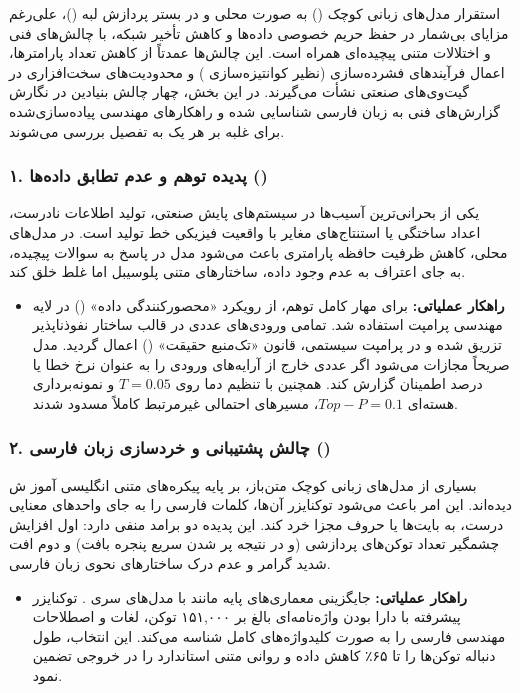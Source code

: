 \documentclass[a4paper, 10pt, twocolumn]{article}
\begin{document}
	استقرار مدل‌های زبانی کوچک () به صورت محلی و در بستر پردازش لبه ()، علی‌رغم مزایای بی‌شمار در حفظ حریم خصوصی داده‌ها و کاهش تأخیر شبکه، با چالش‌های فنی و اختلالات متنی پیچیده‌ای همراه است. این چالش‌ها عمدتاً از کاهش تعداد پارامترها، اعمال فرآیندهای فشرده‌سازی (نظیر کوانتیزه‌سازی ) و محدودیت‌های سخت‌افزاری در گیت‌وی‌های صنعتی نشأت می‌گیرند. در این بخش، چهار چالش بنیادین در نگارش گزارش‌های فنی به زبان فارسی شناسایی شده و راهکارهای مهندسی پیاده‌سازی‌شده برای غلبه بر هر یک به تفصیل بررسی می‌شوند.
	
	\subsubsection{۱. پدیده توهم و عدم تطابق داده‌ها ()}
	یکی از بحرانی‌ترین آسیب‌ها در سیستم‌های پایش صنعتی، تولید اطلاعات نادرست، اعداد ساختگی یا استنتاج‌های مغایر با واقعیت فیزیکی خط تولید است. در مدل‌های محلی، کاهش ظرفیت حافظه پارامتری باعث می‌شود مدل در پاسخ به سوالات پیچیده، به جای اعتراف به عدم وجود داده، ساختارهای متنی پلوسیبل اما غلط خلق کند.
	
	\begin{itemize}
		\item \textbf{راهکار عملیاتی:} برای مهار کامل توهم، از رویکرد «محصورکنندگی داده» () در لایه مهندسی پرامپت استفاده شد. تمامی ورودی‌های عددی در قالب ساختار نفوذناپذیر  تزریق شده و در پرامپت سیستمی، قانون «تک‌منبع حقیقت» () اعمال گردید. مدل صریحاً مجازات می‌شود اگر عددی خارج از آرایه‌های ورودی را به عنوان نرخ خطا یا درصد اطمینان  گزارش کند. همچنین با تنظیم دما روی $T = 0.05$ و نمونه‌برداری هسته‌ای $Top-P = 0.1$، مسیرهای احتمالی غیرمرتبط کاملاً مسدود شدند.
	\end{itemize}
	
	\subsubsection{۲. چالش پشتیبانی و خردسازی زبان فارسی ()}
	بسیاری از مدل‌های زبانی کوچک متن‌باز، بر پایه پیکره‌های متنی انگلیسی آموز ش دیده‌اند. این امر باعث می‌شود توکنایزر آن‌ها، کلمات فارسی را به جای واحدهای معنایی درست، به بایت‌ها یا حروف مجزا خرد کند. این پدیده دو برامد منفی دارد: اول افزایش چشمگیر تعداد توکن‌های پردازشی (و در نتیجه پر شدن سریع پنجره بافت) و دوم افت شدید گرامر و عدم درک ساختارهای نحوی زبان فارسی.
	
	\begin{itemize}
		\item \textbf{راهکار عملیاتی:} جایگزینی معماری‌های پایه مانند  با مدل‌های سری . توکنایزر پیشرفته  با دارا بودن واژه‌نامه‌ای بالغ بر ۱۵۱,۰۰۰ توکن، لغات و اصطلاحات مهندسی فارسی را به صورت کلیدواژه‌های کامل شناسه می‌کند. این انتخاب، طول دنباله توکن‌ها را تا ۶۵٪ کاهش داده و روانی متنی استاندارد را در خروجی تضمین نمود.
	\end{itemize}
	
\end{document}
